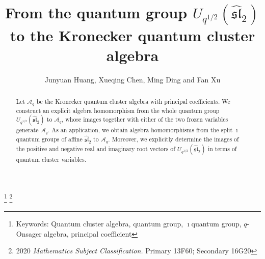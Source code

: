 \documentclass[reqno,11pt]{amsart}
\numberwithin{equation}{section}
\begin{document}
\title[From the  quantum group $U_{q^{1/2}}( {\widehat {\mathfrak{sl}}}_2 )$ to the Kronecker quantum cluster algebra]
{From the  quantum group $U_{q^{1/2}}( {\widehat {\mathfrak{sl}}}_2)$ to the Kronecker quantum cluster algebra}

\author{Junyuan Huang, Xueqing Chen, Ming Ding and Fan Xu}
\address{School of Mathematics and Information Science\\
Guangzhou University, Guangzhou 510006, P.R.China}
\address{Department of Mathematics,
 University of Wisconsin-Whitewater\\
800 W. Main Street, Whitewater, WI.53190. USA}
\address{School of Mathematics and Information Science\\
Guangzhou University, Guangzhou 510006, P.R.China}
\address{Department of Mathematical Sciences\\
Tsinghua University\\
Beijing 100084, P.~R.~China} 






\thanks{Keywords:  Quantum  cluster algebra, quantum group, $\imath$quantum group, $q$-Onsager algebra, principal coefficient}
\thanks{2020 \textit{Mathematics Subject Classification.} Primary 13F60; Secondary 16G20}




\maketitle

\begin{abstract}
Let $\mathcal A_q$ be the Kronecker quantum cluster algebra with principal coefficients. We construct an explicit algebra homomorphism from the whole quantum group ${U_{{q^{1/2}}}}( {{{\widehat {\mathfrak{sl}}}_2}} )$ to $\mathcal A_q$, whose images together with either of the two frozen variables generate $\mathcal A_q$. As an application, we obtain  algebra homomorphisms from the split $\imath$quantum groups of affine $\widehat {\mathfrak{sl}}_2$ to $\mathcal A_q$. Moreover, we explicitly determine the images of the positive and negative real and imaginary root vectors of ${U_{{q^{1/2}}}}( {{{\widehat {\mathfrak{sl}}}_2}} )$ in terms of quantum cluster variables.
\end{abstract}
\end{document}
